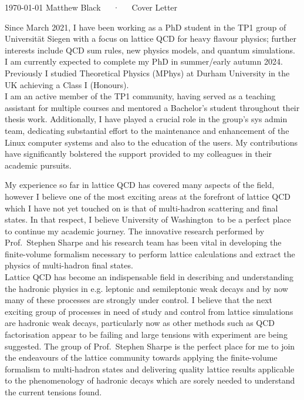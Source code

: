 \documentclass[11pt, a4paper]{awesome-cv}
\newcommand\uni{University of Washington}
\begin{document}
\makecvheader[R]

\makecvfooter
  {\today}
  {Matthew Black~~~·~~~Cover Letter}
  {}

\vspace{-30pt}
\makelettertitle

\begin{cvletter}

Since March 2021, I have been working as a PhD student in the TP1 group of Universit\"at Siegen with a focus on lattice QCD for heavy flavour physics; further interests include QCD sum rules, new physics models, and quantum simulations.
I am currently expected to complete my PhD in summer/early autumn 2024.
Previously I studied Theoretical Physics (MPhys) at Durham University in the UK achieving a Class I (Honours).
\\
I am an active member of the TP1 community, having served as a teaching assistant for multiple courses and mentored a Bachelor's student throughout their thesis work. 
Additionally, I have played a crucial role in the group's sys admin team, dedicating substantial effort to the maintenance and enhancement of the Linux computer systems and also to the education of the users. 
My contributions have significantly bolstered the support provided to my colleagues in their academic pursuits.

\lettersection{Why \uni?}
My experience so far in lattice QCD has covered many aspects of the field, however I believe one of the most exciting areas at the forefront of lattice QCD which I have not yet touched on is that of multi-hadron scattering and final states. 
In that respect, I believe \uni~to be a perfect place to continue my academic journey.
The innovative research performed by Prof.~Stephen Sharpe and his research team has been vital in developing the finite-volume formalism necessary to perform lattice calculations and extract the physics of multi-hadron final states. 
\\
Lattice QCD has become an indispensable field in describing and understanding the hadronic physics in e.g. leptonic and semileptonic weak decays and by now many of these processes are strongly under control.
I believe that the next exciting group of processes in need of study and control from lattice simulations are hadronic weak decays, particularly now as other methods such as QCD factorisation appear to be failing and large tensions with experiment are being suggested. 
The group of Prof.~Stephen Sharpe is the perfect place for me to join the endeavours of the lattice community towards applying the finite-volume formalism to multi-hadron states and delivering quality lattice results applicable to the phenomenology of hadronic decays which are sorely needed to understand the current tensions found.


\end{cvletter}
\end{document}
